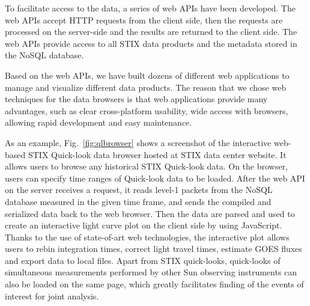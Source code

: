 \documentclass[referee]{aa} %
\begin{document}
To facilitate access to the data, a series of web APIs have been developed.
The web APIs accept HTTP requests from the client side, 
then the requests are processed on the server-side
 and the results are returned to the client side.  
The web APIs provide access to all STIX data products 
and the metadata stored in the NoSQL database. 

Based on the web APIs, we have built dozens of different web applications to manage and visualize 
different data products. 
The reason that we chose web techniques for the data browsers is that
web applications provide many advantages, such as clear cross-platform usability, 
wide access with browsers, allowing rapid development and easy maintenance. 

As an example, 
Fig.~\ref{fig:qlbrowser} shows a screenshot of the interactive web-based STIX Quick-look data browser hosted 
at STIX data center website.  It allows users to browse any historical STIX Quick-look data.
On the browser, users can specify time ranges of Quick-look data to be loaded.
After the web API on the server receives a request, 
it reads level-1 packets from the NoSQL database measured in the given time frame, and sends the
compiled and serialized data back to the web browser. 
Then the data are parsed and used to create an interactive light curve plot on the client side by using JavaScript.
Thanks to the use of state-of-art web technologies, the interactive plot allows users  
to rebin integration times, correct light travel times, estimate GOES fluxes and export data to local files. 
Apart from STIX quick-looks, quick-looks of 
simultaneous measurements performed by other Sun observing instruments
can also be loaded on the same page, which greatly facilitates finding of the 
events of interest for joint analysis. 
\end{document}
